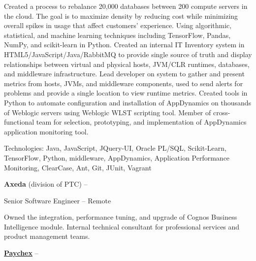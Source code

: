 \documentclass[letterpaper,MMMMyyyy,nonstopmode]{simpleresumecv}
\newif\ifLOCATION
\newif\ifLONG
\begin{document}
\begin{Body}
\begin{Detail}
\BulletItem
Created a process to rebalance 20,000 databases between 200 compute servers in the cloud. The goal is to maximize density by reducing cost while minimizing overall spikes in usage that affect customers' experience. Using algorithmic, statistical, and machine learning techniques including TensorFlow, Pandas, NumPy, and scikit-learn in Python.
\BulletItem
Created an internal IT Inventory system in HTML5/JavaScript/Java/RabbitMQ to provide single source of truth and display relationships between virtual and physical hosts, JVM/CLR runtimes, databases, and middleware infrastructure.
\BulletItem
Lead developer on system to gather and present metrics from hosts, JVMs, and middleware components, used to send alerts for problems and provide a single location to view runtime metrics.
\BulletItem
Created tools in Python to automate configuration and installation of AppDynamics on thousands of Weblogic servers using Weblogic WLST scripting tool.
\BulletItem
Member of cross-functional team for selection, prototyping, and implementation of AppDynamics application monitoring tool. 

\Gap
Technologies: Java, JavaScript, JQuery-UI, Oracle PL/SQL, Scikit-Learn, TensorFlow, Python, middleware, AppDynamics, Application Performance Monitoring, ClearCase, Ant, Git, JUnit, Vagrant
\end{Detail}
\fi

\BigGap

\Entry
\textbf{Axeda} (division of PTC)
\hfill 
 --  

Senior Software Engineer -- Remote
\ifLOCATION
\hfill
Rochester, New York
\fi

\begin{Detail}
\BulletItem
Owned the integration, performance tuning, and upgrade of Cognos Business Intelligence module.
\BulletItem
Internal technical consultant for professional services and product management teams.

\end{Detail}

\ifLONG

\BigGap
\Entry
\href{http://www.paychex.com/}
{\textbf{Paychex}}
\hfill 
 -- 


\end{Body}
\end{document}
